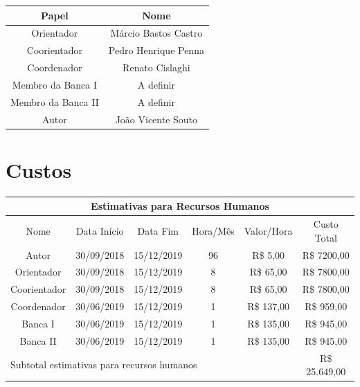 \documentclass[
	12pt,				%
	openright,			%
	twoside,			%
	a4paper,			%
	english,			%
	brazil,				%
	]{abntex2}
\begin{document}
\begin{center}
\begin{tabular}{|c|c|}
\hline
    Papel              & Nome                 \\ \hline
    Orientador         & Márcio Bastos Castro \\ \hline
    Coorientador       & Pedro Henrique Penna \\ \hline
    Coordenador        & Renato Cislaghi      \\ \hline
    Membro da Banca I  & A definir            \\ \hline
    Membro da Banca II & A definir            \\ \hline
    Autor              & João Vicente Souto   \\ \hline
\end{tabular}
\end{center}

\section{Custos}

\begin{center}
\begin{tabular}{|c|c|c|c|c|c|}
\hline
\multicolumn{6}{|c|}{Estimativas para Recursos Humanos} \\ \hline
    Nome         & Data Início & Data Fim   & Hora/Mês & Valor/Hora & Custo Total \\ \hline
    Autor        & 30/09/2018  & 15/12/2019 & 96       & R\$ 5,00   & R\$ 7200,00 \\ \hline
    Orientador   & 30/09/2018  & 15/12/2019 & 8        & R\$ 65,00  & R\$ 7800,00 \\ \hline
    Coorientador & 30/09/2018  & 15/12/2019 & 8        & R\$ 65,00  & R\$ 7800,00 \\ \hline
    Coordenador  & 30/06/2019  & 15/12/2019 & 1        & R\$ 137,00 & R\$ 959,00  \\ \hline
    Banca I      & 30/06/2019  & 15/12/2019 & 1        & R\$ 135,00 & R\$ 945,00  \\ \hline
    Banca II     & 30/06/2019  & 15/12/2019 & 1        & R\$ 135,00 & R\$ 945,00  \\ \hline
\multicolumn{5}{|l|}{Subtotal estimativas para recursos humanos} & R\$ 25.649,00 \\
\hline
\end{tabular}
\end{center}
\end{document}
